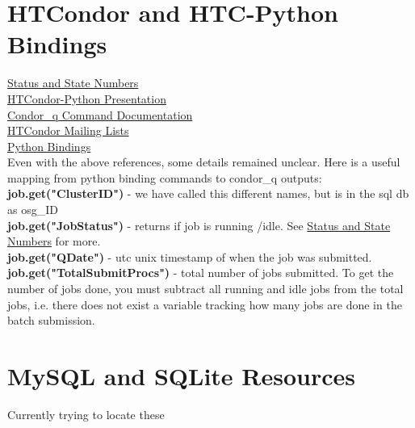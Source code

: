 \section{HTCondor and HTC-Python Bindings}
    \href{http://pages.cs.wisc.edu/~adesmet/status.html}{Status and State Numbers}\\
    \href{https://research.cs.wisc.edu/htcondor/HTCondorWeek2016/presentations/Bockelman_Python-tutorial.pdf}{HTCondor-Python Presentation}\\
    \href{https://research.cs.wisc.edu/htcondor/manual/v8.6/condor_q.html}{Condor\_q Command Documentation}\\
    \href{https://research.cs.wisc.edu/htcondor/mail-lists/}{HTCondor Mailing Lists}\\
    \href{https://htcondor.readthedocs.io/en/latest/apis/python-bindings/index.html}{Python Bindings}\\
    
    
    Even with the above references, some details remained unclear. Here is a useful mapping from python binding commands to condor\_q outputs:\\
    \newline
    \textbf{job.get("ClusterID")} - we have called this different names, but is in the sql db as osg\_ID\\
    \textbf{job.get("JobStatus")} - returns if job is running /idle. See \href{http://pages.cs.wisc.edu/~adesmet/status.html}{Status and State Numbers} for more.\\
    \textbf{job.get("QDate")} - utc unix timestamp of when the job was submitted.\\
    \textbf{job.get("TotalSubmitProcs")} - total number of jobs submitted. To get the number of jobs done, you must subtract all running and idle jobs from the total jobs, i.e. there does not exist a variable tracking how many jobs are done in the batch submission.\\
    
\section{MySQL and SQLite Resources}
    Currently trying to locate these
    